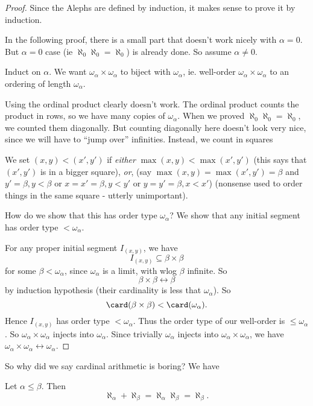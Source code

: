 \documentclass[a4paper]{article}
\begin{document}
\begin{proof}
  Since the Alephs are defined by induction, it makes sense to prove it by induction.

  In the following proof, there is a small part that doesn't work nicely with $\alpha = 0$. But $\alpha = 0$ case (ie $\aleph_0\aleph_0 = \aleph_0$) is already done. So assume $\alpha \not= 0$.

  Induct on $\alpha$. We want $\omega_\alpha \times \omega_\alpha$ to biject with $\omega_\alpha$, ie. well-order $\omega_\alpha \times \omega_\alpha$ to an ordering of length $\omega_\alpha$.

  Using the ordinal product clearly doesn't work. The ordinal product counts the product in rows, so we have many copies of $\omega_\alpha$. When we proved $\aleph_0\aleph_0 = \aleph_0$, we counted them diagonally. But counting diagonally here doesn't look very nice, since we will have to ``jump over'' infinities. Instead, we count in squares
  \begin{center}
  \end{center}
  We set $(x, y) < (x', y')$ if \emph{either} $\max(x, y) < \max(x', y')$ (this says  that $(x', y')$ is in a bigger square), \emph{or}, (say $\max(x, y) = \max(x', y') = \beta$ and $y' = \beta, y < \beta$ or $x = x' = \beta, y < y'$ or $y = y' = \beta, x < x'$) (nonsense used to order things in the same square - utterly unimportant).

  How do we show that this has order type $\omega_\alpha$? We show that any initial segment has order type $ < \omega_\alpha$.

  For any proper initial segment $I_{(x, y)}$, we have
  \[
    I_{(x, y)} \subseteq \beta\times \beta
  \]
  for some $\beta < \omega_\alpha$, since $\omega_\alpha$ is a limit, with wlog $\beta$ infinite. So
  \[
    \beta\times \beta \leftrightarrow \beta
  \]
  by induction hypothesis (their cardinality is less that $\omega_\alpha$). So
  \[
    \card(\beta\times \beta) < \card(\omega_\alpha).
  \]
  Hence $I_{(x, y)}$ has order type $ < \omega_\alpha$. Thus the order type of our well-order is $\leq \omega_\alpha$. So $\omega_\alpha \times \omega_\alpha$ injects into $\omega_\alpha$. Since trivially $\omega_\alpha$ injects into $\omega_\alpha \times \omega_\alpha$, we have $\omega_\alpha \times \omega_\alpha \leftrightarrow \omega_\alpha$.
\end{proof}
So why did we say cardinal arithmetic is boring? We have
\begin{cor}
  Let $\alpha \leq \beta$. Then
  \[
    \aleph_\alpha + \aleph_\beta = \aleph_\alpha\aleph_\beta = \aleph_\beta.
  \]
\end{cor}
\end{document}
